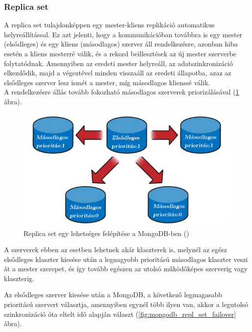 		\subsubsection{Replica set}
			A replica set tulajdonképpen egy mester-kliens replikáció automatikus helyreállítással. Ez azt jelenti, hogy a kommunikációban továbbra is egy mester (elsődleges) és egy kliens (másodlagos) szerver áll rendelkezésre, azonban hiba esetén a kliens mesterré válik, és a rekord beillesztések az új mester szerverbe folytatódnak. Amennyiben az eredeti mester helyreáll, az adatszinkronizáció elkezdődik, majd a végeztével minden visszaáll az eredeti állapotba, azaz az elsődleges szerver lesz ismét a mester, míg másodlagos klienssé válik.\\
			A rendelkezésre állás tovább fokozható másodlagos szerverek priorizálásával (\ref{fig:mongodb_repl_set} ábra).\\
			\begin{figure}[ht]
				\centering
					\includegraphics[scale=0.5]{pictures/mongodb_repl_set.png}%
					\caption[DUMMY]%
					{Replica set egy lehetséges felépítése a MongoDB-ben (\cite{scaling_mongodb_repl_set})}
					\label{fig:mongodb_repl_set}
			\end{figure}
			\newpage
			A szerverek ebben az esetben lehetnek akár klaszterek is, melynél az egész elsődleges klaszter kiesése után a legnagyobb prioritású másodlagos klaszter veszi át a mester szerepet, és így tovább egészen az utolsó működőképes szerverig vagy klaszterig.

			Az elsődleges szerver kiesése után a MongoDB, a következő legmagasabb prioritású szervert választja, amennyiben egynél több ilyen van, akkor a legutolsó szinkronizáció óta eltelt idő alapján választ (\ref{fig:mongodb_repl_set_failover} ábra).
	
